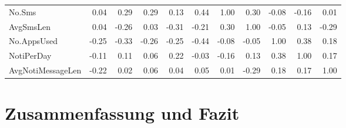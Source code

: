 \begin{landscape}
\begin{table}[]
{\begin{tabular}{@{}l|rrrrrrrrrr@{}}
\multicolumn{1}{|l|}{No.Sms}                  & \cellcolor[HTML]{4FD22F}0.04  & 0.29                          & 0.29                             & 0.13                              & 0.44                           & 1.00                         & 0.30                           & -0.08                            & -0.16                           & 0.01                                   \\ \cmidrule(r){1-1}
\multicolumn{1}{|l|}{AvgSmsLen}               & \cellcolor[HTML]{4FD22F}0.04  & -0.26                         & 0.03                             & -0.31                             & -0.21                          & 0.30                         & 1.00                           & -0.05                            & 0.13                            & -0.29                                  \\ \cmidrule(r){1-1}
\multicolumn{1}{|l|}{No.AppsUsed}             & \cellcolor[HTML]{4FD22F}-0.25 & -0.33                         & -0.26                            & -0.25                             & -0.44                          & -0.08                        & -0.05                          & 1.00                             & 0.38                            & 0.18                                   \\ \cmidrule(r){1-1}
\multicolumn{1}{|l|}{NotiPerDay}              & \cellcolor[HTML]{4FD22F}-0.11 & 0.11                          & 0.06                             & 0.22                              & -0.03                          & -0.16                        & 0.13                           & 0.38                             & 1.00                            & 0.17                                   \\ \cmidrule(r){1-1}
\multicolumn{1}{|l|}{AvgNotiMessageLen}       & \cellcolor[HTML]{4FD22F}-0.22 & 0.02                          & 0.06                             & 0.04                              & 0.05                           & 0.01                         & -0.29                          & 0.18                             & 0.17                            & 1.00                                   \\ \bottomrule
\end{tabular}%
}
\end{table}
\end{landscape}

\section{Zusammenfassung und Fazit}
\label{ch:Evaluierung:sec:zusammenfassung}

